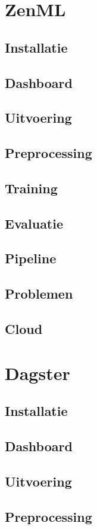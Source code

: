 \section{ZenML}
\subsection{Installatie}
\subsection{Dashboard}
\subsection{Uitvoering}
\subsection{Preprocessing}
\subsection{Training}
\subsection{Evaluatie}
\subsection{Pipeline}
\subsection{Problemen}
\subsection{Cloud}

\section{Dagster}
\subsection{Installatie}
\subsection{Dashboard}
\subsection{Uitvoering}
\subsection{Preprocessing}
